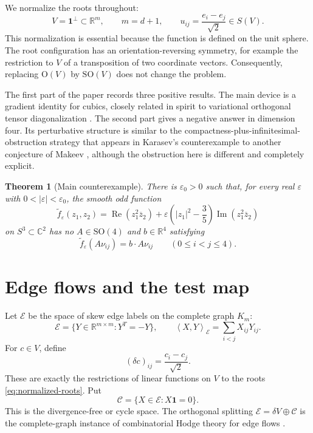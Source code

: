 \documentclass[11pt,reqno]{amsart}
\newtheorem{theorem}{Theorem}[section]
\theoremstyle{definition}
\theoremstyle{remark}
\newcommand{\R}{\mathbb R}
\newcommand{\C}{\mathbb C}
\newcommand{\one}{\mathbf 1}
\newcommand{\SO}{\mathrm{SO}}
\newcommand{\OO}{\mathrm{O}}
\newcommand{\eps}{\varepsilon}
\newcommand{\cE}{\mathcal E}
\newcommand{\cC}{\mathcal C}
\newcommand{\ip}[2]{\left\langle #1,#2\right\rangle}
\newcommand{\abs}[1]{\left\lvert #1\right\rvert}
\begin{document}
We normalize the roots throughout:
\begin{equation}\label{eq:normalized-roots}
V=\one^\perp\subset\R^m,\qquad m=d+1,\qquad
u_{ij}=\frac{e_i-e_j}{\sqrt2}\in S(V).
\end{equation}
This normalization is essential because the function is defined on the unit
sphere.  The root configuration has an orientation-reversing symmetry, for
example the restriction to $V$ of a transposition of two coordinate vectors.
Consequently, replacing $\OO(V)$ by $\SO(V)$ does not change the problem.

The first part of the paper records three positive results.  The main device is
a gradient identity for cubics, closely related in spirit to variational
orthogonal tensor diagonalization \cite{MartinVanLoan2008}.  The second part
gives a negative answer in dimension four.  Its perturbative structure is
similar to the compactness-plus-infinitesimal-obstruction strategy that appears
in Karasev's counterexample to another conjecture of Makeev
\cite{Karasev2016}, although the obstruction here is different and completely
explicit.

\begin{theorem}[Main counterexample]\label{thm:main-counterexample}
There is $\eps_0>0$ such that, for every real $\eps$ with
$0<\abs\eps<\eps_0$, the smooth odd function
\begin{equation}\label{eq:main-counterexample}
\widetilde f_\eps(z_1,z_2)
=
\operatorname{Re}(z_1^2\overline z_2)
+\eps\left(\abs{z_1}^2-\frac35\right)
 \operatorname{Im}(z_1^2\overline z_2)
\end{equation}
on $S^3\subset\C^2$ has no $A\in\SO(4)$ and $b\in\R^4$ satisfying
\[
\widetilde f_\eps(A\nu_{ij})=b\cdot A\nu_{ij}
\qquad(0\le i<j\le4).
\]
\end{theorem}

\section{Edge flows and the test map}\label{sec:test-map}

Let $\cE$ be the space of skew edge labels on the complete graph $K_m$:
\[
\cE=\{Y\in\R^{m\times m}:Y^T=-Y\},
\qquad
\ip{X}{Y}_{\cE}=\sum_{i<j}X_{ij}Y_{ij}.
\]
For $c\in V$, define
\[
(\delta c)_{ij}=\frac{c_i-c_j}{\sqrt2}.
\]
These are exactly the restrictions of linear functions on $V$ to the roots
\eqref{eq:normalized-roots}.  Put
\begin{equation}\label{eq:cycle-space}
\cC=\{X\in\cE:X\one=0\}.
\end{equation}
This is the divergence-free or cycle space.  The orthogonal splitting
$\cE=\delta V\oplus\cC$ is the complete-graph instance of combinatorial Hodge
theory for edge flows \cite{JiangLimYaoYe2011}.
\end{document}
